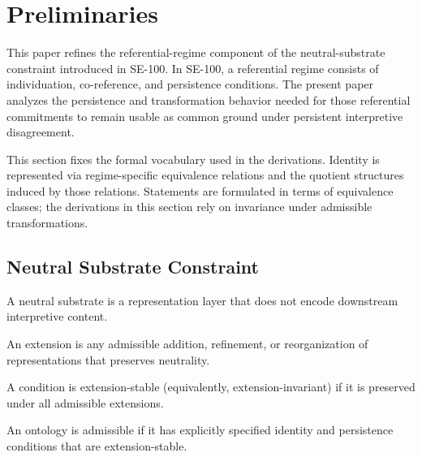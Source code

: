 
\section{Preliminaries}
\label{sec:preliminaries}

This paper refines the referential-regime component of the neutral-substrate
constraint introduced in SE-100. In SE-100, a referential regime consists of
individuation, co-reference, and persistence conditions. The present paper
analyzes the persistence and transformation behavior needed for those
referential commitments to remain usable as common ground under persistent
interpretive disagreement.

This section fixes the formal vocabulary used in the derivations.
Identity is represented via regime-specific equivalence relations
and the quotient structures induced by those relations.
Statements are formulated in terms of equivalence classes;
the derivations in this section rely on invariance under admissible transformations.



\subsection{Neutral Substrate Constraint}
\label{subsec:ns_constraint}

\begin{definition}
  \label{def:neutral_substrate}
  A neutral substrate is a representation layer
  that does not encode downstream interpretive content.
\end{definition}

\begin{definition}[Extension]
  \label{def:extension}
  An extension is any admissible addition, refinement, or reorganization
  of representations that preserves neutrality.
\end{definition}

\begin{definition}
  \label{def:extension_stability}
  A condition is extension-stable (equivalently, extension-invariant)
  if it is preserved under all admissible extensions.
\end{definition}

\begin{definition}
  \label{def:admissible_ontology}
  An ontology is admissible if it has explicitly specified
  identity and persistence conditions that are extension-stable.
\end{definition}


